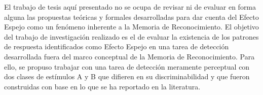 El trabajo de tesis aquí presentado no se ocupa de revisar ni de evaluar en forma alguna las propuestas teóricas y formales desarrolladas para dar cuenta del Efecto Espejo como un fenómeno inherente a la Memoria de Reconocimiento. El objetivo del trabajo de investigación realizado es el de evaluar la existencia de los patrones de respuesta identificados como Efecto Espejo en una tarea de detección desarrollada fuera del marco conceptual de la Memoria de Reconocimiento. Para ello, se propuso trabajar con una tarea de detección meramente perceptual con dos clases de estímulos A y B que difieren en su discriminabilidad y que fueron construidas con base en lo que se ha reportado en la literatura.\\

